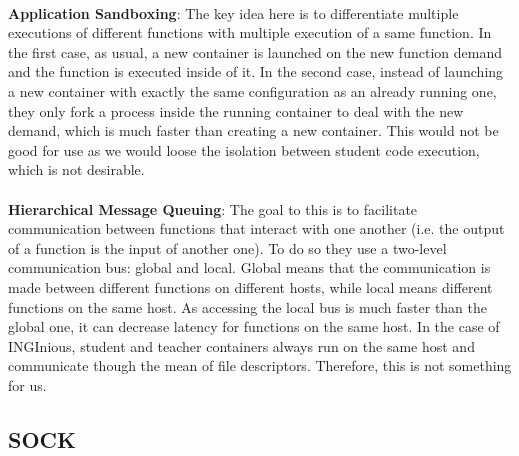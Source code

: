 \paragraph{}\textbf{Application Sandboxing}: The key idea here is to differentiate multiple executions of different functions with multiple execution of a same function.  In the first case, as usual, a new container is launched on the new function demand and the function is executed inside of it.  In the second case, instead of launching a new container with exactly the same configuration as an already running one, they only fork a process inside the running container to deal with the new demand, which is much faster than creating a new container.  This would not be good for use as we would loose the isolation between student code execution, which is not desirable.
\paragraph{}\textbf{Hierarchical Message Queuing}: The goal to this is to facilitate communication between functions that interact with one another (i.e. the output of a function is the input of another one).  To do so they use a two-level communication bus: global and local.  Global means that the communication is made between different functions on different hosts, while local means different functions on the same host.  As accessing the local bus is much faster than the global one, it can decrease latency for functions on the same host.  In the case of INGInious, student and teacher containers always run on the same host and communicate though the mean of file descriptors.  Therefore, this is not something for us.


\subsection{SOCK} \label{subsec-sock}
